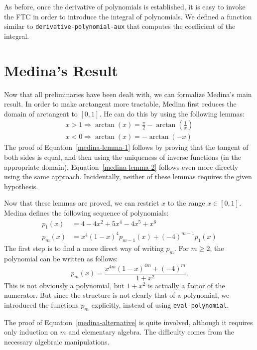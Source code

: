\documentclass[copyright,creativecommons]{eptcs}
\begin{document}
As before, once the derivative of polynomials is established, it is 
easy to invoke the FTC in order to introduce the integral of
polynomials. We defined a function similar to
\texttt{derivative-polynomial-aux} that computes the coefficient of
the integral.

\section{Medina's Result}
\label{medina}

Now that all preliminaries have been dealt with, we can formalize
Medina's main result. In order to make arctangent more tractable,
Medina first reduces the domain of arctangent to $[0,1]$. He can do
this by using the following lemmas:
\begin{gather}
x > 1 \Rightarrow \arctan(x) = \frac{\pi}{2} - \arctan\left(\frac{1}{x}\right) \label{medina-lemma-1}\\
x < 0 \Rightarrow \arctan(x) = -\arctan(-x) \label{medina-lemma-2}
\end{gather}
The proof of Equation~\ref{medina-lemma-1} follows by proving that the
tangent of both sides is equal, and then using the uniqueness of
inverse functions (in the appropriate
domain). Equation~\ref{medina-lemma-2} follows even more directly
using the same approach. Incidentally, neither of these lemmas
requires the given hypothesis.

Now that these lemmas are proved, we can restrict $x$ to the range
$x\in[0,1]$. Medina defines the following sequence of polynomials:
\begin{align}
p_1(x) &= 4 - 4x^2 + 5x^4 - 4x^5 + x^6 \\
p_m(x) &= x^4(1-x)^4 p_{m-1}(x) + (-4)^{m-1} p_1(x)
\end{align}
The first step is to find a more direct way of writing $p_m$.  For
$m\ge 2$, the polynomial can be written as follows:
\begin{equation}
\label{medina-alternative}
p_m(x) = \frac{x^{4m}(1-x)^{4m} + (-4)^m}{1+x^2}.
\end{equation}
This is not obviously a polynomial, but $1+x^2$ is actually a factor
of the numerator. But since the structure is not clearly that of a
polynomial, we introduced the functions $p_m$ explicitly, instead of
using \texttt{eval-polynomial}.

The proof of Equation~\ref{medina-alternative} is quite involved,
although it requires only induction on $m$ and elementary algebra.
The difficulty comes from the necessary algebraic manipulations.
\end{document}
